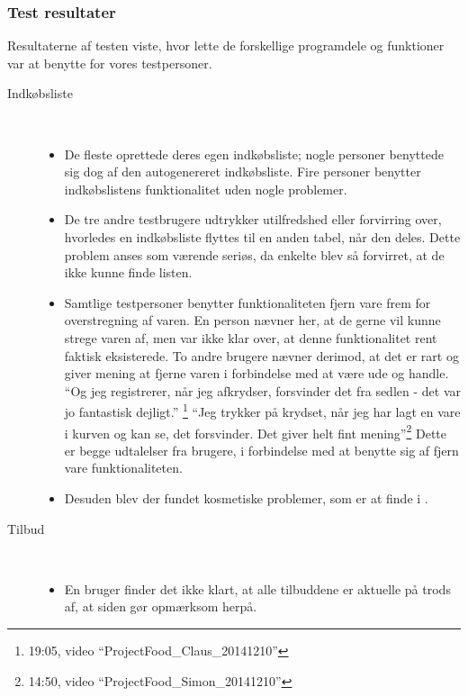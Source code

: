 \subsubsection{Test resultater}\label{ss:bt2}
Resultaterne af testen viste, hvor lette de forskellige programdele og funktioner var at benytte for vores testpersoner.
\begin{description}
   \item[Indkøbsliste]\hfill\\
   \vspace{-15pt}
   \begin{itemize}[nolistsep, noitemsep]
      \item De fleste oprettede deres egen indkøbsliste; nogle personer benyttede sig dog af den autogenereret indkøbsliste. 
      Fire personer benytter indkøbslistens funktionalitet uden nogle problemer.
      \item De tre andre testbrugere udtrykker utilfredshed eller forvirring over, hvorledes en indkøbsliste flyttes til en anden tabel, når den deles.
      Dette problem anses som værende seriøs, da enkelte blev så forvirret, at de ikke kunne finde listen. 
      \item Samtlige testpersoner benytter funktionaliteten fjern vare frem for overstregning af varen. 
      En person nævner her, at de gerne vil kunne strege varen af, men var ikke klar over, at denne funktionalitet rent faktisk eksisterede.
      To andre brugere nævner derimod, at det er rart og giver mening at fjerne varen i forbindelse med at være ude og handle.
      ``Og jeg registrerer, når jeg afkrydser, forsvinder det fra sedlen - det var jo fantastisk dejligt.'' \footnote{19:05, video ``ProjectFood_Claus_20141210''}
      ``Jeg trykker på krydset, når jeg har lagt en vare i kurven og kan se, det forsvinder. Det giver helt fint mening''\footnote{14:50, video ``ProjectFood_Simon_20141210''}
      Dette er begge udtalelser fra brugere, i forbindelse med at benytte sig af fjern vare funktionaliteten.
      \item Desuden blev der fundet kosmetiske problemer, som er at finde i .
   \end{itemize}
   \item[Tilbud]\hfill\\
   \vspace{-15pt}
   \begin{itemize}[nolistsep, noitemsep]
      \item En bruger finder det ikke klart, at alle tilbuddene er aktuelle på trods af, at siden gør opmærksom herpå.

\end{itemize}
\end{description}
